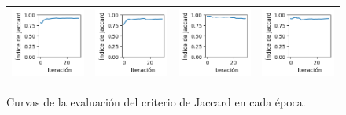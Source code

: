 \begin{figure}[!b]
\begin{tabular}{cccc}
        \includegraphics[width=3.5cm]{../Plots/score_epoch_12.png} &
        \includegraphics[width=3.5cm]{../Plots/score_epoch_13.png} &
        \includegraphics[width=3.5cm]{../Plots/score_epoch_14.png} &
        \includegraphics[width=3.5cm]{../Plots/score_epoch_15.png} \\
        
    \end{tabular}
    \caption{Curvas de la evaluación del criterio de Jaccard en cada época.}
    \label{fig:iou_epochs}
\end{figure}

